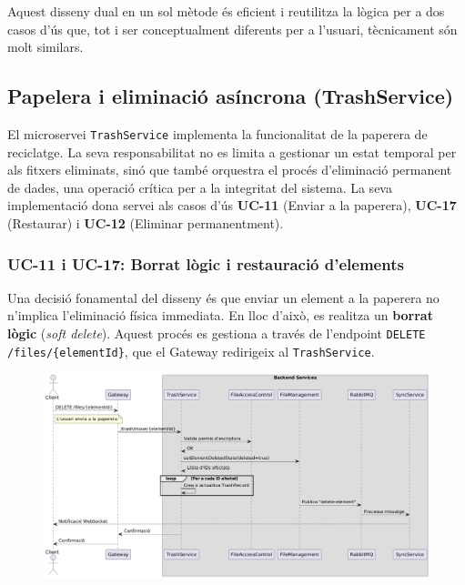 Aquest disseny dual en un sol mètode és eficient i reutilitza la lògica per a dos casos d'ús que, tot i ser conceptualment diferents per a l'usuari, tècnicament són molt similars.

\subsection{Papelera i eliminació asíncrona (TrashService)}

El microservei \texttt{TrashService} implementa la funcionalitat de la paperera de reciclatge. La seva responsabilitat no es limita a gestionar un estat temporal per als fitxers eliminats, sinó que també orquestra el procés d'eliminació permanent de dades, una operació crítica per a la integritat del sistema. La seva implementació dona servei als casos d'ús \textbf{UC-11} (Enviar a la paperera), \textbf{UC-17} (Restaurar) i \textbf{UC-12} (Eliminar permanentment).

\subsubsection{UC-11 i UC-17: Borrat lògic i restauració d'elements}

Una decisió fonamental del disseny és que enviar un element a la paperera no n'implica l'eliminació física immediata. En lloc d'això, es realitza un \textbf{borrat lògic} (\textit{soft delete}). Aquest procés es gestiona a través de l'endpoint \texttt{DELETE /files/\{elementId\}}, que el Gateway redirigeix al \texttt{TrashService}.

\begin{figure}[H]
    \centering
    \includegraphics[width=\textwidth]{Figures/flux/move_to_trash.png}
\end{figure}

